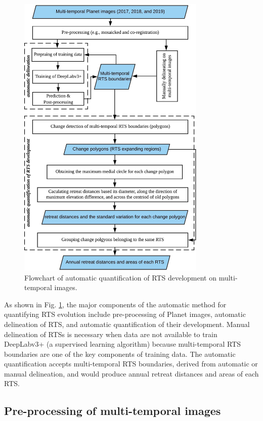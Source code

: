 \documentclass[authoryear,preprint,review,12pt]{elsarticle}
\begin{document}
\begin{figure}
	\centering
	\includegraphics[width=9cm]{figs/polygon_based_change_detection_flowchart.jpg}
	\caption{Flowchart of automatic quantification of RTS development on multi-temporal images.}
	\label{fig_flowchart}
\end{figure}

 As shown in Fig. \ref{fig_flowchart}, the major components of the automatic method for quantifying RTS evolution include pre-processing of Planet images, automatic delineation of RTS, and automatic quantification of their development. 
Manual delineation of RTSs is necessary when data are not available to train DeepLabv3+ (a supervised learning algorithm) because multi-temporal RTS boundaries are one of the key components of training data.
The automatic quantification accepts multi-temporal RTS boundaries, derived from automatic or manual delineation, and would produce annual retreat distances and areas of each RTS. 


\subsection{Pre-processing of multi-temporal images}
\label{sec_preprocessing}
\end{document}
